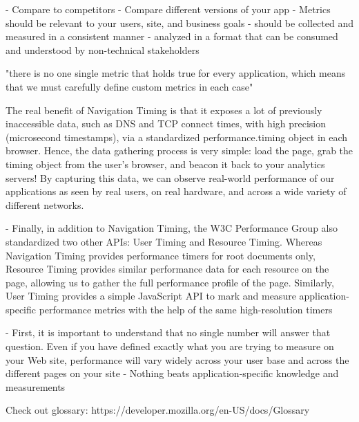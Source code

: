 - Compare to competitors
- Compare different versions of your app
- Metrics should be relevant to your users, site, and business goals
- should be collected and measured in a consistent manner
- analyzed in a format that can be consumed and understood by non-technical stakeholders




"there is no one single metric that holds true for every application, which means that we must carefully define custom metrics in each case"

The real benefit of Navigation Timing is that it exposes a lot of previously inaccessible data, such as DNS and TCP connect times, with high precision (microsecond timestamps), via a standardized performance.timing object in each browser. Hence, the data gathering process is very simple: load the page, grab the timing object from the user’s browser, and beacon it back to your analytics servers! By capturing this data, we can observe real-world performance of our applications as seen by real users, on real hardware, and across a wide variety of different networks.

- Finally, in addition to Navigation Timing, the W3C Performance Group also standardized two other APIs: User Timing and Resource Timing. Whereas Navigation Timing provides performance timers for root documents only, Resource Timing provides similar performance data for each resource on the page, allowing us to gather the full performance profile of the page. Similarly, User Timing provides a simple JavaScript API to mark and measure application-specific performance metrics with the help of the same high-resolution timers



- First, it is important to understand that no single number will answer that question. Even if you have defined exactly what you are trying to measure on your Web site, performance will vary widely across your user base and across the different pages on your site
- Nothing beats application-specific knowledge and measurements






Check out glossary: https://developer.mozilla.org/en-US/docs/Glossary



